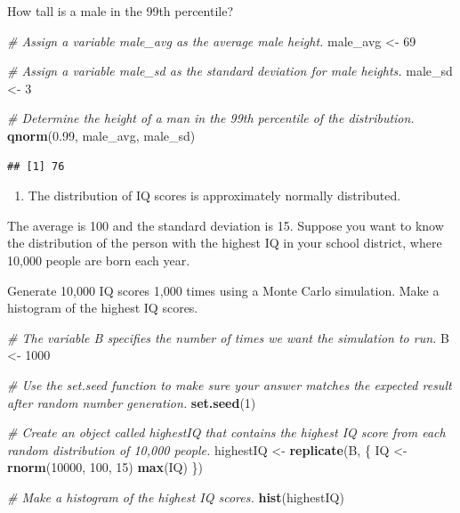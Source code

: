 \documentclass[
]{article}
\newenvironment{Shaded}{\begin{snugshade}}{\end{snugshade}}
\newcommand{\CommentTok}[1]{\textcolor[rgb]{0.56,0.35,0.01}{\textit{#1}}}
\newcommand{\DecValTok}[1]{\textcolor[rgb]{0.00,0.00,0.81}{#1}}
\newcommand{\FloatTok}[1]{\textcolor[rgb]{0.00,0.00,0.81}{#1}}
\newcommand{\KeywordTok}[1]{\textcolor[rgb]{0.13,0.29,0.53}{\textbf{#1}}}
\newcommand{\NormalTok}[1]{#1}
\newcommand{\StringTok}[1]{\textcolor[rgb]{0.31,0.60,0.02}{#1}}
\providecommand{\tightlist}{%
  \setlength{\itemsep}{0pt}\setlength{\parskip}{0pt}}
\begin{document}
How tall is a male in the 99th percentile?

\begin{Shaded}
\begin{Highlighting}[]
\CommentTok{\# Assign a variable \textquotesingle{}male\_avg\textquotesingle{} as the average male height.}
\NormalTok{male\_avg \textless{}{-}}\StringTok{ }\DecValTok{69}

\CommentTok{\# Assign a variable \textquotesingle{}male\_sd\textquotesingle{} as the standard deviation for male heights.}
\NormalTok{male\_sd \textless{}{-}}\StringTok{ }\DecValTok{3}

\CommentTok{\# Determine the height of a man in the 99th percentile of the distribution.}
\KeywordTok{qnorm}\NormalTok{(}\FloatTok{0.99}\NormalTok{, male\_avg, male\_sd)}
\end{Highlighting}
\end{Shaded}

\begin{verbatim}
## [1] 76
\end{verbatim}

\begin{enumerate}
\def\labelenumi{\arabic{enumi}.}
\setcounter{enumi}{6}
\tightlist
\item
  The distribution of IQ scores is approximately normally distributed.
\end{enumerate}

The average is 100 and the standard deviation is 15. Suppose you want to
know the distribution of the person with the highest IQ in your school
district, where 10,000 people are born each year.

Generate 10,000 IQ scores 1,000 times using a Monte Carlo simulation.
Make a histogram of the highest IQ scores.

\begin{Shaded}
\begin{Highlighting}[]
\CommentTok{\# The variable \textasciigrave{}B\textasciigrave{} specifies the number of times we want the simulation to run.}
\NormalTok{B \textless{}{-}}\StringTok{ }\DecValTok{1000}

\CommentTok{\# Use the \textasciigrave{}set.seed\textasciigrave{} function to make sure your answer matches the expected result after random number generation.}
\KeywordTok{set.seed}\NormalTok{(}\DecValTok{1}\NormalTok{)}

\CommentTok{\# Create an object called \textasciigrave{}highestIQ\textasciigrave{} that contains the highest IQ score from each random distribution of 10,000 people.}
\NormalTok{highestIQ \textless{}{-}}\StringTok{ }\KeywordTok{replicate}\NormalTok{(B, \{}
\NormalTok{    IQ \textless{}{-}}\StringTok{ }\KeywordTok{rnorm}\NormalTok{(}\DecValTok{10000}\NormalTok{, }\DecValTok{100}\NormalTok{, }\DecValTok{15}\NormalTok{)}
    \KeywordTok{max}\NormalTok{(IQ) }
\NormalTok{\})}

\CommentTok{\# Make a histogram of the highest IQ scores.}
\KeywordTok{hist}\NormalTok{(highestIQ)}
\end{Highlighting}
\end{Shaded}
\end{document}
